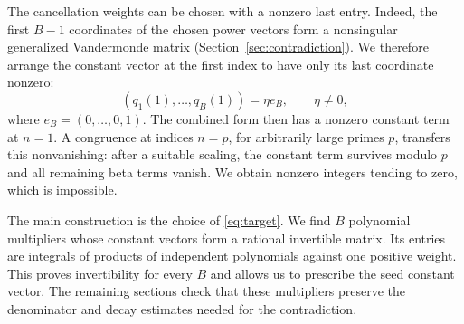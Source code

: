The cancellation weights can be chosen with a nonzero last entry.
Indeed, the first $B-1$ coordinates of the chosen power vectors
form a nonsingular generalized Vandermonde matrix
(Section~\ref{sec:contradiction}). We therefore arrange the constant
vector at the first index to have only its last coordinate nonzero:
\begin{equation}\label{eq:target}
 (q_1(1),\ldots,q_B(1))=\eta e_B,\qquad \eta\ne0,
\end{equation}
where $e_B=(0,\ldots,0,1)$. The combined form then has a nonzero
constant term at $n=1$. A congruence at indices $n=p$, for arbitrarily large primes
$p$, transfers this nonvanishing: after a suitable scaling, the
constant term survives modulo $p$ and all remaining beta terms
vanish. We obtain nonzero integers tending to zero, which is
impossible.

The main construction is the choice of \eqref{eq:target}. We find
$B$ polynomial multipliers whose constant vectors form a rational
invertible matrix. Its entries are integrals of products of
independent polynomials against one positive weight. This proves
invertibility for every $B$ and allows us to prescribe the seed
constant vector. The remaining sections check that these multipliers
preserve the denominator and decay estimates needed for the
contradiction.
